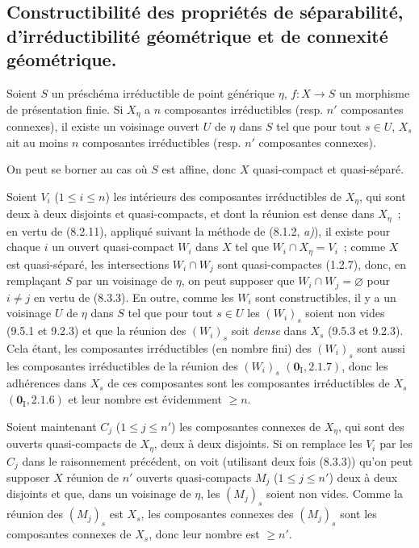\subsection{Constructibilité des propriétés de séparabilité, d'irréductibilité
géométrique et de connexité géométrique.}
\label{subsection:IV.9.7-fr}

\begin{lemma}[9.7.1]
\label{IV.9.7.1-fr}
Soient $S$ un préschéma irréductible de point générique $\eta$, $f:X\to S$
un morphisme de présentation finie. Si $X_\eta$ a $n$ composantes irréductibles
(\textup{resp.} $n'$ composantes connexes), il existe un voisinage ouvert $U$ de $\eta$
dans $S$ tel que pour tout $s\in U$, $X_s$ ait au moins $n$ composantes
irréductibles (\textup{resp.} $n'$ composantes connexes).
\end{lemma}

On peut se borner au cas où $S$ est affine, donc $X$ quasi-compact et
quasi-séparé.

Soient $V_i$ ($1\leqslant i\leqslant n$) les intérieurs des
composantes irréductibles de $X_\eta$, qui sont deux à deux disjoints et
quasi-compacts, et dont la réunion est dense dans $X_\eta$~; en vertu de
(8.2.11), appliqué suivant la méthode de (8.1.2, \emph{a)}), il existe pour
chaque $i$ un ouvert quasi-compact $W_i$ dans $X$ tel que
$W_i\cap X_\eta=V_i$~; comme $X$ est quasi-séparé, les intersections
$W_i\cap W_j$ sont quasi-compactes (1.2.7), donc, en remplaçant $S$
par un voisinage de $\eta$, on peut supposer que $W_i\cap W_j=\varnothing$ pour
$i\neq j$ en vertu de (8.3.3). En outre, comme les $W_i$ sont constructibles,
il y a un voisinage $U$ de $\eta$ dans $S$ tel que pour tout $s\in U$ les
$(W_i)_s$ soient non vides (9.5.1 et 9.2.3) et que la réunion des $(W_i)_s$ soit
\emph{dense} dans $X_s$ (9.5.3 et 9.2.3). Cela étant, les composantes
irréductibles (en nombre fini) des $(W_i)_s$ sont aussi les composantes
irréductibles de la réunion des $(W_i)_s$ $(\mathbf 0_{\mathrm I},2.1.7)$, donc
les adhérences dans $X_s$ de ces composantes sont les composantes
irréductibles de $X_s$ $(\mathbf 0_{\mathrm I},2.1.6)$ et leur nombre est
évidemment $\geqslant n$.

Soient maintenant $C_j$ ($1\leqslant j\leqslant n'$) les composantes connexes
de $X_\eta$, qui sont des ouverts quasi-compacts de $X_\eta$, deux à deux
disjoints. Si on remplace les $V_i$ par les $C_j$ dans le raisonnement
précédent, on voit (utilisant deux fois (8.3.3)) qu'on peut supposer $X$ réunion
de $n'$ ouverts quasi-compacts $M_j$ ($1\leqslant j\leqslant n'$) deux à deux
disjoints et que, dans un voisinage de $\eta$, les $(M_j)_s$ soient non vides.
Comme la réunion des $(M_j)_s$ est $X_s$, les composantes connexes des $(M_j)_s$
sont les composantes connexes de $X_s$, donc leur nombre est $\geqslant n'$.

